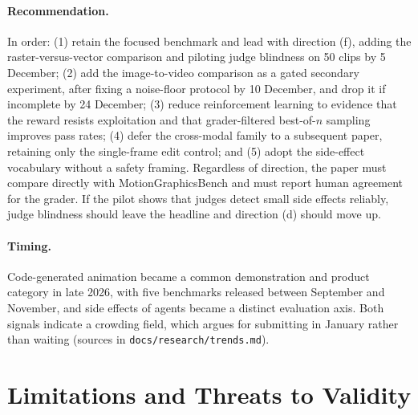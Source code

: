 \documentclass[11pt]{article}
\begin{document}
\paragraph{Recommendation.} In order: (1) retain the focused benchmark and lead with direction (f), adding the raster-versus-vector comparison and piloting judge blindness on 50 clips by 5 December; (2) add the image-to-video comparison as a gated secondary experiment, after fixing a noise-floor protocol by 10 December, and drop it if incomplete by 24 December; (3) reduce reinforcement learning to evidence that the reward resists exploitation and that grader-filtered best-of-$n$ sampling improves pass rates; (4) defer the cross-modal family to a subsequent paper, retaining only the single-frame edit control; and (5) adopt the side-effect vocabulary without a safety framing. Regardless of direction, the paper must compare directly with MotionGraphicsBench and must report human agreement for the grader. If the pilot shows that judges detect small side effects reliably, judge blindness should leave the headline and direction (d) should move up.

\paragraph{Timing.} Code-generated animation became a common demonstration and product category in late 2026, with five benchmarks released between September and November, and side effects of agents became a distinct evaluation axis. Both signals indicate a crowding field, which argues for submitting in January rather than waiting (sources in \texttt{docs/research/trends.md}).

\section{Limitations and Threats to Validity}
\end{document}
